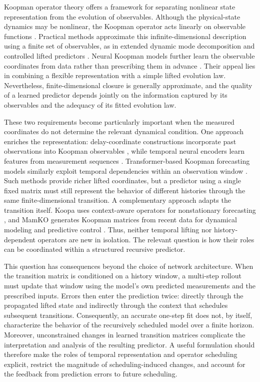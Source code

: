 \documentclass[journal]{IEEEtran}
\begin{document}
Koopman operator theory offers a framework for separating nonlinear state representation from the evolution of observables. Although the physical-state dynamics may be nonlinear, the Koopman operator acts linearly on observable functions \cite{koopman1931hamiltonian,mezic2005spectral,brunton2022modern}. Practical methods approximate this infinite-dimensional description using a finite set of observables, as in extended dynamic mode decomposition and controlled lifted predictors \cite{williams2015data,proctor2016dmdc,korda2018linear}. Neural Koopman models further learn the observable coordinates from data rather than prescribing them in advance \cite{takeishi2017koopman,lusch2018deep,otto2019linearly,han2020deep}. Their appeal lies in combining a flexible representation with a simple lifted evolution law. Nevertheless, finite-dimensional closure is generally approximate, and the quality of a learned predictor depends jointly on the information captured by its observables and the adequacy of its fitted evolution law.

These two requirements become particularly important when the measured coordinates do not determine the relevant dynamical condition. One approach enriches the representation: delay-coordinate constructions incorporate past observations into Koopman observables \cite{kamb2020timedelay,das2019delay}, while temporal neural encoders learn features from measurement sequences \cite{han2024robust,shenoy2025temporal}. Transformer-based Koopman forecasting models similarly exploit temporal dependencies within an observation window \cite{forootani2025deepkoopformer}. Such methods provide richer lifted coordinates, but a predictor using a single fixed matrix must still represent the behavior of different histories through the same finite-dimensional transition. A complementary approach adapts the transition itself. Koopa uses context-aware operators for nonstationary forecasting \cite{liu2023koopa}, and MamKO generates Koopman matrices from recent data for dynamical modeling and predictive control \cite{li2025mamko}. Thus, neither temporal lifting nor history-dependent operators are new in isolation. The relevant question is how their roles can be coordinated within a structured recursive predictor.

This question has consequences beyond the choice of network architecture. When the transition matrix is conditioned on a history window, a multi-step rollout must update that window using the model's own predicted measurements and the prescribed inputs. Errors then enter the prediction twice: directly through the propagated lifted state and indirectly through the context that schedules subsequent transitions. Consequently, an accurate one-step fit does not, by itself, characterize the behavior of the recursively scheduled model over a finite horizon. Moreover, unconstrained changes in learned transition matrices complicate the interpretation and analysis of the resulting predictor. A useful formulation should therefore make the roles of temporal representation and operator scheduling explicit, restrict the magnitude of scheduling-induced changes, and account for the feedback from prediction errors to future scheduling.
\end{document}
